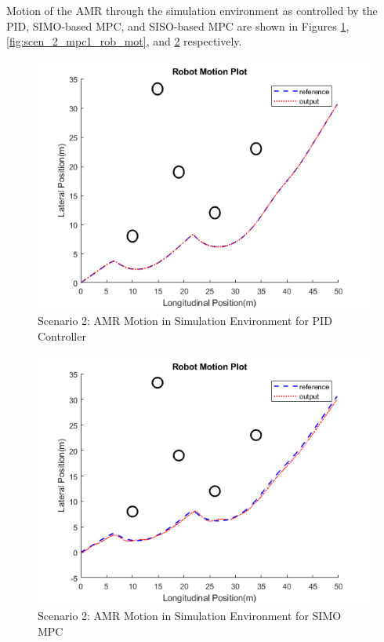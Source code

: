 \documentclass[a4paper, twocolumn]{article}
\begin{document}
Motion of the AMR through the simulation environment as controlled by the PID, SIMO-based MPC, and SISO-based MPC are shown in Figures \ref{fig:scen_2_pid_rob_mot}, \ref{fig:scen_2_mpc1_rob_mot}, and \ref{fig:scen_2_mpc2_rob_mot} respectively. 

\begin{figure}
    \centering
    \includegraphics[scale=0.40]{img/scenario_2/pid-robot_motion.png}
    \caption{Scenario 2: AMR Motion in Simulation Environment for PID Controller}
    \label{fig:scen_2_pid_rob_mot}
\end{figure}

\begin{figure}
    \centering
    \includegraphics[scale=0.40]{img/scenario_2/mpc2-robot_motion.png}
    \caption{Scenario 2: AMR Motion in Simulation Environment for SIMO MPC}
    \label{fig:scen_2_mpc2_rob_mot}
\end{figure}
\end{document}
